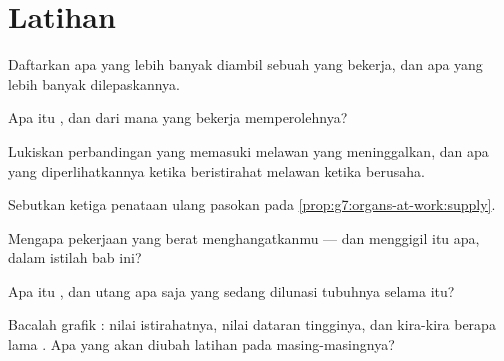 \section{Latihan}

\begin{exercise}[$\star$]\label{exo:g7:organs-at-work:1}
Daftarkan apa yang lebih banyak diambil sebuah  yang bekerja, dan
apa yang lebih banyak dilepaskannya.
\end{exercise}

\begin{exercise}[$\star$]\label{exo:g7:organs-at-work:2}
Apa itu , dan dari mana  yang bekerja memperolehnya?
\end{exercise}

\begin{exercise}[$\star$]\label{exo:g7:organs-at-work:3}
Lukiskan perbandingan  yang memasuki melawan yang meninggalkan,
dan apa yang diperlihatkannya ketika beristirahat melawan ketika
berusaha.
\end{exercise}

\begin{exercise}[$\star$]\label{exo:g7:organs-at-work:4}
Sebutkan ketiga penataan ulang pasokan pada
\cref{prop:g7:organs-at-work:supply}.
\end{exercise}

\begin{exercise}[$\star$]\label{exo:g7:organs-at-work:5}
Mengapa pekerjaan yang berat menghangatkanmu --- dan menggigil itu
apa, dalam istilah bab ini?
\end{exercise}

\begin{exercise}[$\star$]\label{exo:g7:organs-at-work:6}
Apa itu , dan utang apa saja yang sedang dilunasi tubuhnya
selama  itu?
\end{exercise}

\begin{exercise}[$\star\star$]\label{exo:g7:organs-at-work:7}
Bacalah grafik : nilai istirahatnya, nilai dataran
tingginya, dan kira-kira berapa lama . Apa yang akan
diubah latihan pada masing-masingnya?
\end{exercise}

